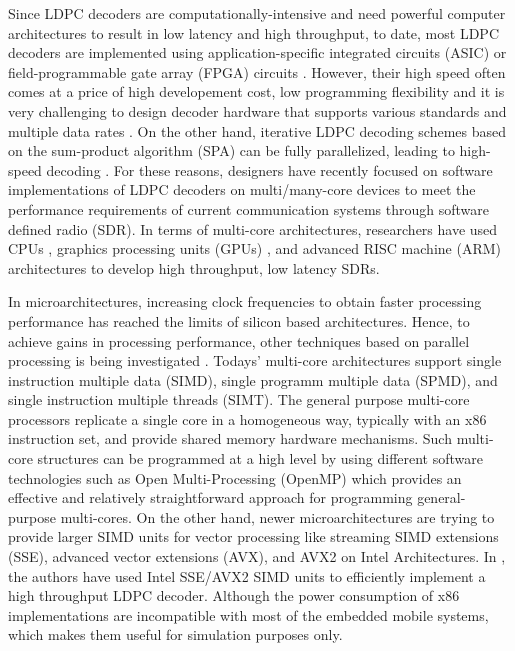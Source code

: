 \documentclass[10pt,a4paper]{article}
\begin{document}
Since LDPC decoders are computationally-intensive and need powerful computer architectures to result in low latency and high throughput, to date, most LDPC decoders are implemented using application-specific integrated circuits (ASIC) or field-programmable gate array (FPGA) circuits \cite{art_ldpc_OpenCl_1}. However, their high speed often comes at a price of high developement cost, low programming flexibility \cite{art_convolutional} and it is very challenging to design decoder hardware that supports various standards and multiple data rates \cite{art_cuda_openmp}. On the other hand, iterative LDPC decoding schemes based on the sum-product algorithm (SPA) can be fully parallelized, leading to high-speed decoding \cite{art_shannon}. For these reasons, designers have recently focused on software implementations of LDPC decoders on multi/many-core devices \cite{art_massively} to meet the performance requirements of current communication systems through software defined radio (SDR). In terms of multi-core architectures, researchers have used CPUs \cite{art_cpu_gpu, art_ldpc_cpu0}, graphics processing units (GPUs) \cite{art_memory_coalesced, art_massively, art_optimize_0}, and advanced RISC machine (ARM) \cite{art_ldpc_cpu0, art_neon} architectures to develop high throughput, low latency SDRs. 

In microarchitectures, increasing clock frequencies to obtain faster processing performance has reached the limits of silicon based architectures. Hence, to achieve gains in processing performance, other techniques based on parallel processing is being investigated \cite{art_ldpc_cpu1}. Todays' multi-core architectures support single instruction multiple data (SIMD), single programm multiple data (SPMD), and single instruction multiple threads (SIMT). The general purpose multi-core processors replicate a single core in a homogeneous way, typically with an x86 instruction set, and provide shared memory hardware mechanisms\cite{art_massively}. Such multi-core structures can be programmed at a high level by using different software technologies \cite{art_multicore_techs} such as Open Multi-Processing (OpenMP) \cite{art_openMp_book} which provides an effective and relatively straightforward approach for programming general-purpose multi-cores. On the other hand, newer microarchitectures are trying to provide larger SIMD units for vector processing like streaming SIMD extensions (SSE), advanced vector extensions (AVX), and AVX2 \cite{art_intel_sse} on Intel Architectures. In \cite{art_ldpc_cpu1}, the authors have used Intel SSE/AVX2 SIMD units to efficiently implement a high throughput LDPC decoder. Although the power consumption of x86 implementations are incompatible with most of the embedded mobile systems, which makes them useful for simulation purposes only.
\end{document}
